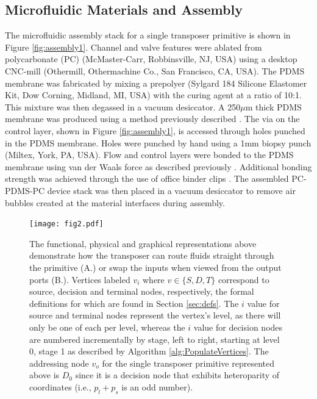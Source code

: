 \subsection{Microfluidic Materials and Assembly}
\label{sec:assembly}
The microfluidic assembly stack for a single transposer primitive is shown in Figure \ref{fig:assembly1}. Channel and valve features were ablated from polycarbonate (PC) (McMaster-Carr, Robbinsville, NJ, USA) using a desktop CNC-mill (Othermill, Othermachine Co., San Francisco, CA, USA). The PDMS membrane was fabricated by mixing a prepolyer (Sylgard 184 Silicone Elastomer Kit, Dow Corning, Midland, MI, USA) with the curing agent at a ratio of 10:1. This mixture was then degassed in a vacuum desiccator. A 250$\mu$m thick PDMS membrane was produced using a method previously described \cite{horner2012}. The via on the control layer, shown in Figure \ref{fig:assembly1}, is accessed through holes punched in the PDMS membrane. Holes were punched by hand using a 1mm biopsy punch (Miltex, York, PA, USA). Flow and control layers were bonded to the PDMS membrane using van der Waals force as described previously \cite{mcdonald2002poly}\cite{duncan2013}. Additional bonding strength was achieved through the use of office binder clips \cite{duncan2015scaling}. The assembled PC-PDMS-PC device stack was then placed in a vacuum desiccator to remove air bubbles created at the material interfaces during assembly.
\begin{figure}[h]
  \begin{minipage}[t]{0.99\linewidth}\centering
    \texttt{[image: fig2.pdf]}
    \medskip
  \end{minipage}\hfill
  \caption[Functional, physical, and graphical representations of a transposer]{The functional, physical and graphical representations above demonstrate how the transposer can route fluids straight through the primitive (A.) or swap the inputs when viewed from the output ports (B.). Vertices labeled $v_i$ where $v\in\{S,D,T\}$ correspond to source, decision and terminal nodes, respectively, the formal definitions for which are found in Section \ref{sec:defs}. The $i$ value for source and terminal nodes represent the vertex's level, as there will only be one of each per level, whereas the $i$ value for decision nodes are numbered incrementally by stage, left to right, starting at level 0, stage 1 as described by Algorithm \ref{alg:PopulateVertices}. The addressing node $v_o$ for the single transposer primitive represented above is $D_0$ since it is a decision node that exhibits heteroparity of coordinates (i.e., $p_l+p_s$ is an odd number).}
	\label{fig:modes}
\end{figure}

